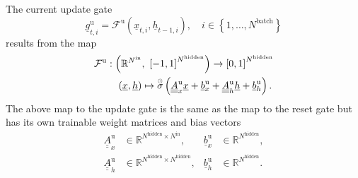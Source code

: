 The current update gate 
\begin{equation}
    \underline g^\text{u}_{t,i} 
    =
    \mathcal{F}^\text{u} \left( \underline x_{t,i}, \underline h_{t-1,i}\right)
    ,\quad i \in \left\{1, \dots, N^\text{batch}\right\}
\end{equation}
results from the map
\begin{align} \label{eq:gru_update}
    \mathcal{F}^\text{u}
    &:
    \left(\mathbb{R}^{N^\text{in}},\ \left[-1, 1\right]^{N^\text{hidden}}\right)
    \rightarrow
    \left[0, 1\right]^{N^\text{hidden}}
    \nonumber \\ & \quad
    \left(\underline x,\underline h\right)
    \mapsto
    \overset{\scriptscriptstyle \odot}{\sigma} \left(
        \underline{\underline A}^\text{u}_{x} \underline x
        +
        \underline b^\text{u}_{x}
        +
        \underline{\underline A}^\text{u}_{h} \underline h
        +
        \underline b^\text{u}_{h}
    \right).
\end{align}
The above map to the update gate is the same 
as the map to the reset gate but has 
its own trainable weight matrices and bias vectors
\begin{align} \label{eq:gru_update_params}
    \underline{\underline A}^\text{u}_{x} & \in \mathbb{R}^{
        N^\text{hidden}
        \times
        N^\text{in}
    },
    & \underline{b}^\text{u}_{x} & \in \mathbb{R}^{N^\text{hidden}},
    \nonumber \\
    \underline{\underline A}^\text{u}_{h} & \in \mathbb{R}^{
        N^\text{hidden}
        \times
        N^\text{hidden}
    },
    & \underline{b}^\text{u}_{h} & \in \mathbb{R}^{N^\text{hidden}}.
\end{align}


